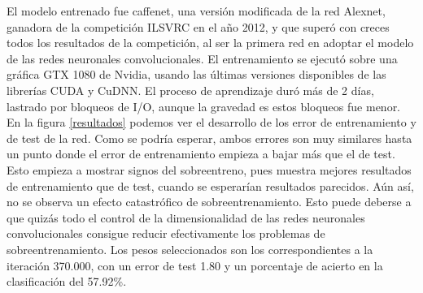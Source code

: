 El modelo entrenado fue caffenet, una versión modificada de la red Alexnet, ganadora de la competición ILSVRC en el año 2012, y que superó con creces todos los resultados de la competición, al ser la primera red en adoptar el modelo de las redes neuronales convolucionales. El entrenamiento se ejecutó sobre una gráfica GTX 1080 de Nvidia, usando las últimas versiones disponibles de las librerías CUDA y CuDNN. El proceso de aprendizaje duró más de 2 días, lastrado por bloqueos de I/O, aunque la gravedad es estos bloqueos fue menor.\\
 
En la figura \ref{resultados} podemos ver el desarrollo de los error de entrenamiento y de test de la red. Como se podría esperar, ambos errores son muy similares hasta un punto donde el error de entrenamiento empieza a bajar más que el de test. Esto empieza a mostrar signos del sobreentreno, pues muestra mejores resultados de entrenamiento que de test, cuando se esperarían resultados parecidos. Aún así, no se observa un efecto catastrófico de sobreentrenamiento. Esto puede deberse a que quizás todo el control de la dimensionalidad de las redes neuronales convolucionales consigue reducir efectivamente los problemas de sobreentrenamiento.  Los pesos seleccionados son los correspondientes a la iteración 370.000, con un error de test 1.80 y un porcentaje de acierto en la clasificación del 57.92\%.
